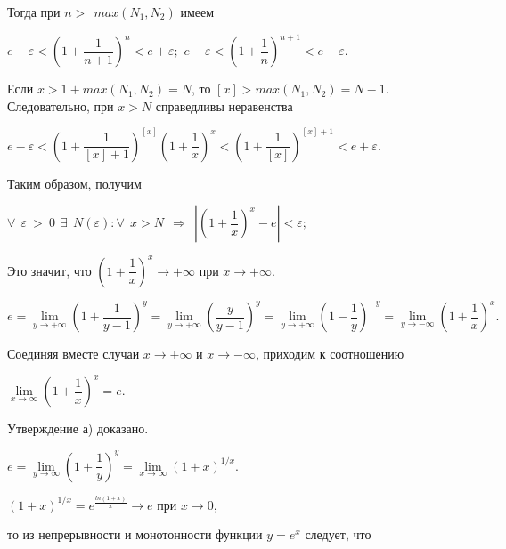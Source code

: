 Тогда при $n>\:\:max(N_1, N_2)$ имеем

\begin{center}
$e-\varepsilon <\left(1+\dfrac{1}{n+1} \right )^{n}<e+\varepsilon;$
$e-\varepsilon <\left(1+\dfrac{1}{n} \right )^{n+1}<e+\varepsilon.$
\end{center}   
Если $x>1+max(N_1, N_2)=N$, то $[x]>max(N_1, N_2)=N  -  1$.
 Следовательно, при $x>N$ справедливы неравенства
 
\begin{center}
$
e-\varepsilon <\left(1+\dfrac{1}{[x]+1} \right )^{[x]}\left(1+\dfrac{1}{x} \right )^{x}<\left(1+\dfrac{1}{[x]} \right )^{[x]+1}<e+\varepsilon.
$
\end{center} 
Таким образом, получим
\begin{center}
 $
\forall\: \: \varepsilon\: >\: 0   \:\:  \exists \:\:  N(\varepsilon ):\forall\: \:  x>N \: \: \Rightarrow \: \:  \left | \left(1+\dfrac{1}{x}\right)^{x}-e \right |<\varepsilon ;
   $
\end{center} 
Это значит, что $\left(1+\dfrac{1}{x}\right)^{x} \rightarrow  +\infty $ при $ x \rightarrow  +\infty $. 

\begin{center}
$
e= \lim\limits_{y\to+\infty} \left(1+\dfrac{1}{y-1}\right)^{y} = \lim\limits_{y\to+\infty} \left(\dfrac{y}{y-1}\right)^{y} = \lim\limits_{y\to+\infty} \left(1-\dfrac{1}{y}\right)^{-y}= \lim\limits_{y\to-\infty} \left(1+\dfrac{1}{x}\right)^{x}.
$
\end{center}
Соединяя вместе случаи $x \rightarrow +\infty $ и $x \rightarrow -\infty $, приходим к соотношению 
\begin{center}
$
 \lim\limits_{x\to\infty} \left(1+\dfrac{1}{x}\right)^{x} = e.
$
\end{center}
Утверждение а) доказано.

\begin{center}
$
 e=\lim\limits_{y\to\infty} \left(1+\dfrac{1}{y}\right)^{y} =  \lim\limits_{x\to\infty} \left(1+x\right)^{1/x}.
$
\end{center}

\begin{center}
$(1+x)^{1/x}=e^{\frac{ln(1+x)}{x}}\rightarrow e$ при $x\rightarrow 0,$
\end{center}
то из непрерывности и монотонности функции $y=e^{x}$ следует, что

